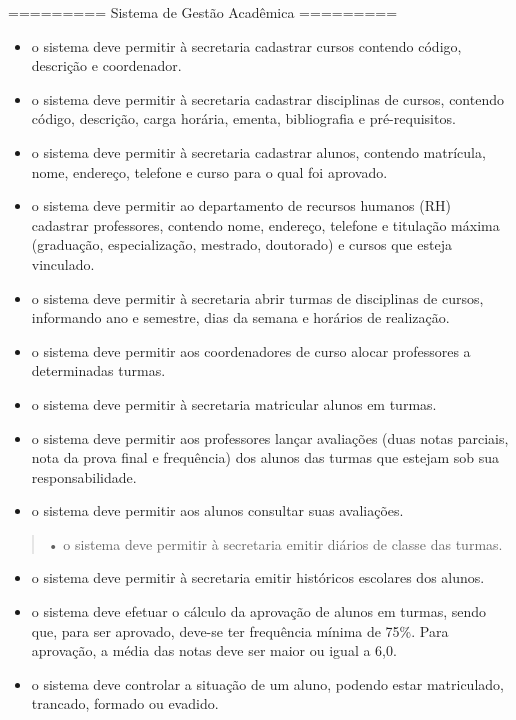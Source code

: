 ========= Sistema de Gestão Acadêmica =========

\begin{itemize}
\item
  o sistema deve permitir à secretaria cadastrar cursos contendo código,
  descrição e coordenador.
\item
  o sistema deve permitir à secretaria cadastrar disciplinas de cursos,
  contendo código, descrição, carga horária, ementa, bibliografia e
  pré-requisitos.
\item
  o sistema deve permitir à secretaria cadastrar alunos, contendo
  matrícula, nome, endereço, telefone e curso para o qual foi aprovado.
\item
  o sistema deve permitir ao departamento de recursos humanos (RH)
  cadastrar professores, contendo nome, endereço, telefone e titulação
  máxima (graduação, especialização, mestrado, doutorado) e cursos que
  esteja vinculado.
\item
  o sistema deve permitir à secretaria abrir turmas de disciplinas de
  cursos, informando ano e semestre, dias da semana e horários de
  realização.
\item
  o sistema deve permitir aos coordenadores de curso alocar professores
  a determinadas turmas.
\item
  o sistema deve permitir à secretaria matricular alunos em turmas.
\item
  o sistema deve permitir aos professores lançar avaliações (duas notas
  parciais, nota da prova final e frequência) dos alunos das turmas que
  estejam sob sua responsabilidade.
\item
  o sistema deve permitir aos alunos consultar suas avaliações.
\end{itemize}

\begin{quote}
• o sistema deve permitir à secretaria emitir diários de classe das
turmas.
\end{quote}

\begin{itemize}
\item
  o sistema deve permitir à secretaria emitir históricos escolares dos
  alunos.
\item
  o sistema deve efetuar o cálculo da aprovação de alunos em turmas,
  sendo que, para ser aprovado, deve-se ter frequência mínima de 75\%.
  Para aprovação, a média das notas deve ser maior ou igual a 6,0.
\item
  o sistema deve controlar a situação de um aluno, podendo estar
  matriculado, trancado, formado ou evadido.
\end{itemize}

